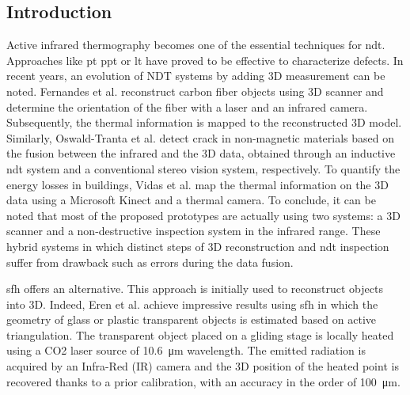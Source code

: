 \documentclass[12pt]{spieman}
\begin{document}
\begin{spacing}{2}   %


\acresetall  %

\section{Introduction}

Active infrared thermography becomes one of the essential techniques for \ac{ndt}. Approaches like \ac{pt}\cite{Maldague2002} \ac{ppt} \cite{Maldague1996} or \ac{lt} \cite{Wu1998} have proved to be effective to characterize defects. 
In recent years, an evolution of NDT systems by adding 3D measurement can be noted. Fernandes et al.\cite{fernandes2015fiber} reconstruct carbon fiber objects using 3D scanner and determine the orientation of the fiber with a laser and an infrared camera. Subsequently, the thermal information is mapped to the reconstructed 3D model. Similarly, Oswald-Tranta et al.\cite{Oswald-Tranta2012} detect crack in non-magnetic materials based on the fusion between the infrared and the 3D data, obtained through an inductive \ac{ndt} system and a conventional stereo vision system, respectively.
To quantify the energy losses in buildings, Vidas et al.\cite{Vidas2013} map the thermal information on the 3D data using a Microsoft Kinect and a thermal camera. To conclude, it can be noted that most of the proposed prototypes are actually using two systems: a 3D scanner and a non-destructive inspection system in the infrared range. These hybrid systems in which distinct steps of 3D reconstruction and \ac{ndt} inspection suffer from drawback such as errors during the data fusion.



\ac{sfh} offers an alternative. This approach is initially used to reconstruct objects into 3D. Indeed, Eren et al.\cite{Eren2009} achieve impressive results using \ac{sfh} in which the geometry of glass or plastic transparent objects is estimated based on active triangulation. The transparent object placed on a gliding stage is locally heated using a CO2 laser source of \SI{10.6}{\micro \metre} wavelength. The emitted radiation is acquired by an Infra-Red (IR) camera and the 3D position of the heated point is recovered thanks to a prior calibration, with an accuracy in the order of \SI{100}{\micro \metre}.


\end{spacing}
\end{document}
